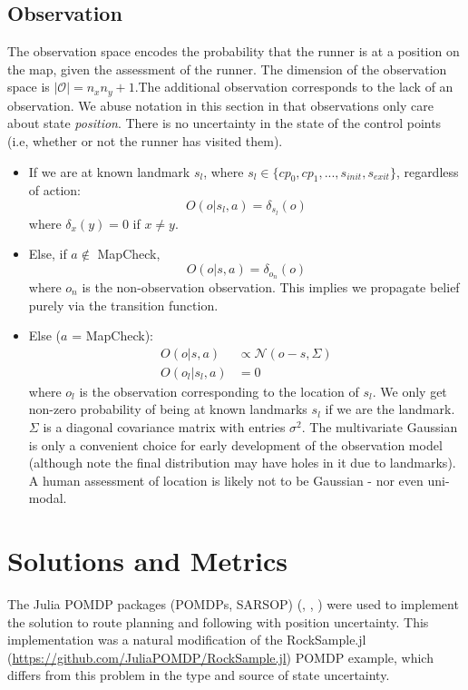 \documentclass[twoside,11pt]{article}
\begin{document}
\subsection*{Observation}

The observation space encodes the probability that the runner is at a position on the map, given the assessment of the runner. The dimension of the observation space is $| \mathcal{O} | = n_x n_y + 1$.The additional observation corresponds to the lack of an observation. We abuse notation in this section in that observations only care about state \textit{position}. There is no uncertainty in the state of the control points (i.e, whether or not the runner has visited them). 

\begin{itemize}
\item If we are at known landmark $s_l$, where $s_l \in \{cp_0,cp_1,...,s_{init},s_{exit}\}$, regardless of action:
\begin{equation*}
O(o|s_l,a) = \delta_{s_l}(o)
\end{equation*}
where $\delta_x(y)=0$ if $x \neq y$.
\item Else, if $a \notin $ MapCheck,
\begin{equation*}
O(o|s,a) = \delta_{o_n}(o)
\end{equation*}
where $o_n$ is the non-observation observation. This implies we propagate belief purely via the transition function.
\item Else ($a$ = MapCheck):
\begin{align*}
O(o|s,a) &\propto \mathcal{N}(o-s,\Sigma)\\
O(o_l|s_l,a) &= 0
\end{align*}
where $o_l$ is the observation corresponding to the location of $s_l$.
We only get non-zero probability of being at known landmarks $s_l$ if we are the landmark. $\Sigma$ is a diagonal covariance matrix with entries $\sigma^2$. The multivariate Gaussian is only a convenient choice for early development of the observation model (although note the final distribution may have holes in it due to landmarks). A human assessment of location is likely not to be Gaussian - nor even uni-modal.
\end{itemize}

\section{Solutions and Metrics}

The Julia POMDP packages (POMDPs, SARSOP) (\cite{egorov2017pomdps}, \cite{Kurniawati-RSS08}, \cite{Ong2009POMDPsFR}) were used to implement the solution to route planning and following with position uncertainty. This implementation was a natural modification of the RockSample.jl (\url{https://github.com/JuliaPOMDP/RockSample.jl}) POMDP example, which differs from this problem in the type and source of state uncertainty.
\end{document}
